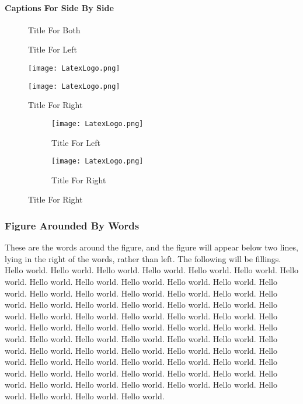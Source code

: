 \paragraph{Captions For Side By Side}
\begin{figure}[H]
    \caption{Title For Both}
    \parbox[b]{0.5\textwidth}{\centering
        \caption{Title For Left}
        \texttt{[image: LatexLogo.png]}}
    \parbox[b]{0.5\textwidth}{\centering
        \caption{Title For Right}
        \texttt{[image: LatexLogo.png]}}
\end{figure}

\begin{figure}[H]
    \caption{Title For Both}
    \begin{subfigure}[b]{0.5\textwidth}
        \centering
        \texttt{[image: LatexLogo.png]}
        \caption{Title For Left}
    \end{subfigure}
    \begin{subfigure}[b]{0.5\textwidth}
        \centering
        \texttt{[image: LatexLogo.png]}
        \caption{Title For Right}
    \end{subfigure}
\end{figure}

\subsubsection{Figure Arounded By Words}
\begin{figwindow}      %
    These are the words around the figure, and the figure will appear below two lines, 
    lying in the right of the words, rather than left. The following will be fillings. 
    Hello world. Hello world. Hello world. Hello world. Hello world. Hello world. Hello world. 
    Hello world. Hello world. Hello world. Hello world. Hello world. Hello world. Hello world. 
    Hello world. Hello world. Hello world. Hello world. Hello world. Hello world. Hello world. 
    Hello world. Hello world. Hello world. Hello world. Hello world. Hello world. Hello world. 
    Hello world. Hello world. Hello world. Hello world. Hello world. Hello world. Hello world. 
    Hello world. Hello world. Hello world. Hello world. Hello world. Hello world. Hello world. 
    Hello world. Hello world. Hello world. Hello world. Hello world. Hello world. Hello world. 
    Hello world. Hello world. Hello world. Hello world. Hello world. Hello world. Hello world. 
    Hello world. Hello world. Hello world. Hello world. Hello world. Hello world. Hello world. 
    Hello world. Hello world. Hello world. Hello world. Hello world. Hello world. Hello world.
\end{figwindow}


